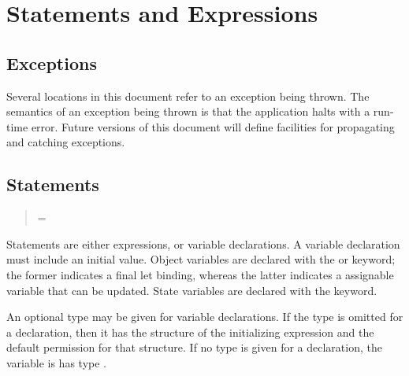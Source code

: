 \section{Statements and Expressions}

\subsection{Exceptions}

Several locations in this document refer to an exception being thrown.
The semantics of an exception being thrown is that the application
halts with a run-time error.  Future versions of this document will
define facilities for propagating and catching exceptions.

\subsection{Statements}


\begin{quote}

 {}

 {}

 {}



 {}   = 


 {}  



 {}

 {}

\end{quote}

Statements are either expressions, or variable declarations.  A
variable declaration must include an initial value.  Object variables are
declared with the  or  keyword; the former
indicates a final let binding, whereas the latter indicates a
assignable variable that can be updated.
State variables are declared with the  keyword. 

An optional type may be given for variable declarations.  If the type
is omitted for a  declaration, then it has the
structure of the initializing expression and the default permission
 for that structure. If no type is given for a  
declaration, the variable is has type .

